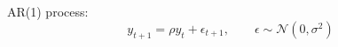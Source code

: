 \section{}
AR(1) process:
\begin{equation}
    y_{t+1} = \rho y_{t}+ \epsilon_{t+1},\qquad \epsilon \sim \mathcal{N}(0, \sigma^2)
\end{equation}




